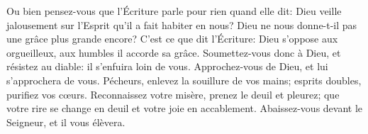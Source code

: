 Ou bien pensez-vous que l’Écriture parle pour rien quand elle dit:
	Dieu veille jalousement sur l’Esprit qu’il a fait habiter en nous?
Dieu ne nous donne-t-il pas une grâce plus grande encore?
	C’est ce que dit l’Écriture:
	Dieu s’oppose aux orgueilleux, aux humbles il accorde sa grâce.
Soumettez-vous donc à Dieu, et résistez au diable:
	il s’enfuira loin de vous.
Approchez-vous de Dieu, et lui s’approchera de vous.
Pécheurs, enlevez la souillure de vos mains;
	esprits doubles, purifiez vos cœurs.
Reconnaissez votre misère, prenez le deuil et pleurez;
	que votre rire se change en deuil et votre joie en accablement.
	Abaissez-vous devant le Seigneur, et il vous élèvera.
